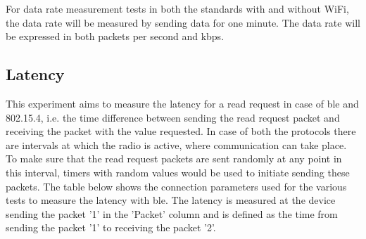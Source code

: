 For data rate measurement tests in both the standards with and without WiFi, the data rate will be measured by sending data for one minute. The data rate will be expressed in both packets per second and \gls{kbps}. 

\subsection{Latency}
This experiment aims to measure the latency for a read request in case of \gls{ble} and 802.15.4, i.e. the time difference between sending the read request packet and receiving the packet with the value requested. In case of both the protocols there are intervals at which the radio is active, where communication can take place. To make sure that the read request packets are sent randomly at any point in this interval, timers with random values would be used to initiate sending these packets. The table below shows the connection parameters used for the various tests to measure the latency with \gls{ble}. The latency is measured at the device sending the packet '1' in the 'Packet' column and is defined as the time from sending the packet '1' to receiving the packet '2'.



